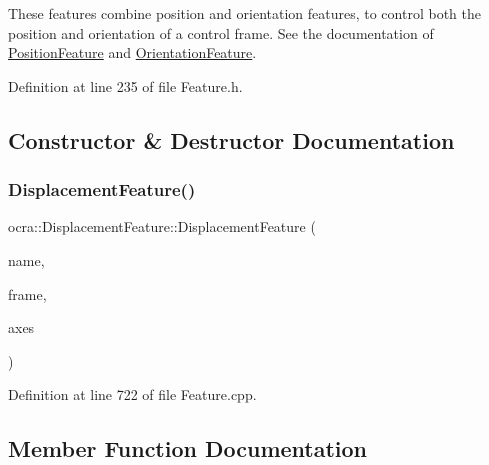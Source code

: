 These features combine position and orientation features, to control both the position and orientation of a control frame. See the documentation of \hyperlink{classocra_1_1PositionFeature}{Position\+Feature} and \hyperlink{classocra_1_1OrientationFeature}{Orientation\+Feature}. 

Definition at line 235 of file Feature.\+h.



\subsection{Constructor \& Destructor Documentation}
\hypertarget{classocra_1_1DisplacementFeature_a9c48bb5ac5d4a856df9c2d879bc4b072}{}\label{classocra_1_1DisplacementFeature_a9c48bb5ac5d4a856df9c2d879bc4b072} 
\subsubsection{\texorpdfstring{Displacement\+Feature()}{DisplacementFeature()}}
{\footnotesize\ttfamily ocra\+::\+Displacement\+Feature\+::\+Displacement\+Feature (\begin{DoxyParamCaption}\item[{const std\+::string \&}]{name,  }\item[{Control\+Frame\+::\+Ptr}]{frame,  }\item[{\hyperlink{namespaceocra_a436781c7059a0f76027df1c652126260}{E\+Cartesian\+Dof}}]{axes }\end{DoxyParamCaption})}



Definition at line 722 of file Feature.\+cpp.



\subsection{Member Function Documentation}
\hypertarget{classocra_1_1DisplacementFeature_a622cd1b7305b26fbbb2f78784fd0ebf0}{}\label{classocra_1_1DisplacementFeature_a622cd1b7305b26fbbb2f78784fd0ebf0} 
